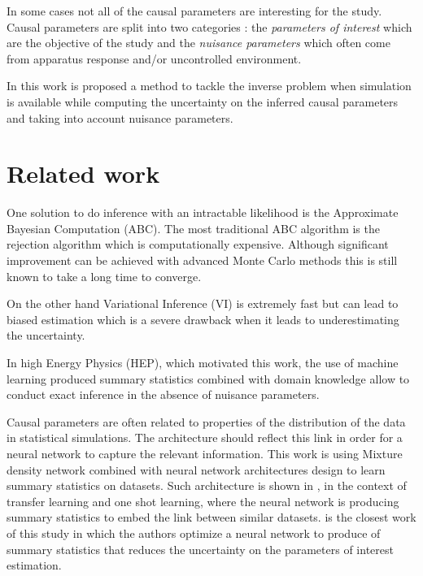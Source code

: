 In some cases not all of the causal parameters are interesting for the study.
Causal parameters are split into two categories : the \emph{parameters of interest} which are the objective of the study and the \emph{nuisance parameters} which often come from apparatus response and/or uncontrolled environment.

In this work is proposed a method to tackle the inverse problem when simulation is available while computing the uncertainty on the inferred causal parameters and taking into account nuisance parameters.


\section{Related work}





One solution to do inference with an intractable likelihood is the Approximate Bayesian Computation (ABC).
The most traditional ABC algorithm is the rejection algorithm which is computationally expensive.
Although significant improvement can be achieved with advanced Monte Carlo methods this is still known to take a long time to converge.

On the other hand Variational Inference (VI) is extremely fast but can lead to biased estimation which is a severe drawback when it leads to underestimating the uncertainty.

In high Energy Physics (HEP), which motivated this work, the use of machine learning produced summary statistics combined with domain knowledge allow to conduct exact inference in the absence of nuisance parameters.


Causal parameters are often related to properties of the distribution of the data in statistical simulations.
The architecture should reflect this link in order for a neural network to capture the relevant information.
This work is using Mixture density network \cite{Bishop94mixturedensity} combined with neural network architectures design to learn summary statistics on datasets.
Such architecture is shown in \cite{Edwards17neuralstatistician}, in the context of transfer learning and one shot learning, where the neural network is producing summary statistics to embed the link between similar datasets.
\cite{DECASTRO2019170inferno} is the closest work of this study in which the authors optimize a neural network to produce of summary statistics that reduces the uncertainty on the parameters of interest estimation.


